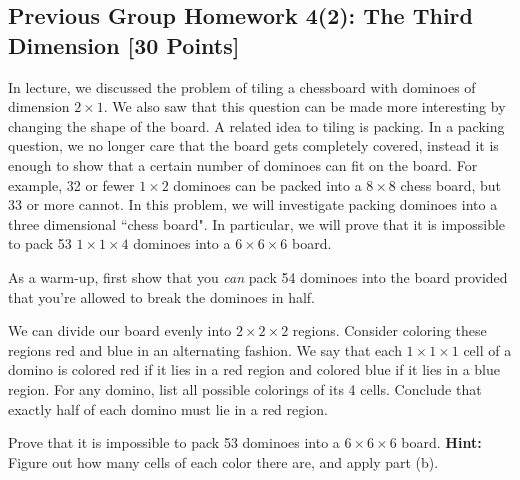 \documentclass[12pt]{exam}
\begin{document}
\subsection*{Previous Group Homework 4(2): The Third Dimension [30 Points]}
In lecture, we discussed the problem of tiling a chessboard with dominoes of
dimension $2 \times 1$. We also saw that this question can be made more interesting
by changing the shape of the board.
A related idea to tiling is packing. In a packing question, we no longer care that
the board gets completely covered, instead it is enough to show that a certain
number of dominoes can fit on the board. For example, 32 or fewer $1 \times 2$
dominoes can be packed into a $8 \times 8$ chess board, but 33 or more cannot.
In this problem, we will investigate packing dominoes into a three dimensional
``chess board". In particular, we will prove that it is impossible to pack 53 $1\times 1\times 4$ dominoes into a $6\times 6\times 6$ board.
\begin{qparts}
\item As a warm-up, first show that you \textit{can} pack 54 dominoes into the
board provided that you're allowed to break the dominoes in half.
\item We can divide our board evenly into $2\times 2\times 2$ regions. Consider
coloring these regions red and blue in an alternating fashion. We say that each
$1 \times 1 \times 1$ cell of a domino is colored red if it lies in a red region
and colored blue if it lies in a blue region.
For any domino, list all possible colorings of its 4 cells. Conclude that
exactly half of each domino must lie in a red region.
\item Prove that it is impossible to pack 53 dominoes into a $6\times 6\times
6$ board.
\textbf{Hint:} Figure out how many cells of each color there are, and apply
part (b).
\end{qparts}
\end{document}
